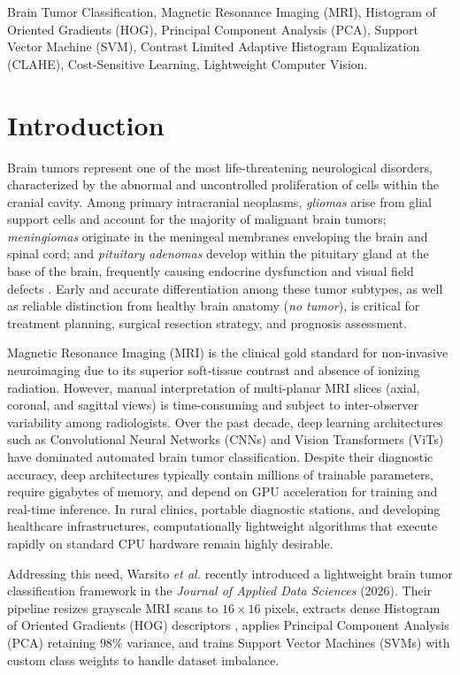 \documentclass[conference]{IEEEtran}
\begin{document}
\begin{IEEEkeywords}
Brain Tumor Classification, Magnetic Resonance Imaging (MRI), Histogram of Oriented Gradients (HOG), Principal Component Analysis (PCA), Support Vector Machine (SVM), Contrast Limited Adaptive Histogram Equalization (CLAHE), Cost-Sensitive Learning, Lightweight Computer Vision.
\end{IEEEkeywords}

\section{Introduction}
Brain tumors represent one of the most life-threatening neurological disorders, characterized by the abnormal and uncontrolled proliferation of cells within the cranial cavity. Among primary intracranial neoplasms, \emph{gliomas} arise from glial support cells and account for the majority of malignant brain tumors; \emph{meningiomas} originate in the meningeal membranes enveloping the brain and spinal cord; and \emph{pituitary adenomas} develop within the pituitary gland at the base of the brain, frequently causing endocrine dysfunction and visual field defects \cite{cheng2015enhanced}. Early and accurate differentiation among these tumor subtypes, as well as reliable distinction from healthy brain anatomy (\emph{no tumor}), is critical for treatment planning, surgical resection strategy, and prognosis assessment.

Magnetic Resonance Imaging (MRI) is the clinical gold standard for non-invasive neuroimaging due to its superior soft-tissue contrast and absence of ionizing radiation. However, manual interpretation of multi-planar MRI slices (axial, coronal, and sagittal views) is time-consuming and subject to inter-observer variability among radiologists. Over the past decade, deep learning architectures such as Convolutional Neural Networks (CNNs) \cite{deepak2019brain, sultan2019multi} and Vision Transformers (ViTs) \cite{tummala2022classification} have dominated automated brain tumor classification. Despite their diagnostic accuracy, deep architectures typically contain millions of trainable parameters, require gigabytes of memory, and depend on GPU acceleration for training and real-time inference. In rural clinics, portable diagnostic stations, and developing healthcare infrastructures, computationally lightweight algorithms that execute rapidly on standard CPU hardware remain highly desirable.

Addressing this need, Warsito \emph{et al.} \cite{warsito2026lightweight} recently introduced a lightweight brain tumor classification framework in the \emph{Journal of Applied Data Sciences} (2026). Their pipeline resizes grayscale MRI scans to $16 \times 16$ pixels, extracts dense Histogram of Oriented Gradients (HOG) descriptors \cite{dalal2005histograms}, applies Principal Component Analysis (PCA) retaining $98\%$ variance, and trains Support Vector Machines (SVMs) \cite{cortes1995support} with custom class weights to handle dataset imbalance.
\end{document}
